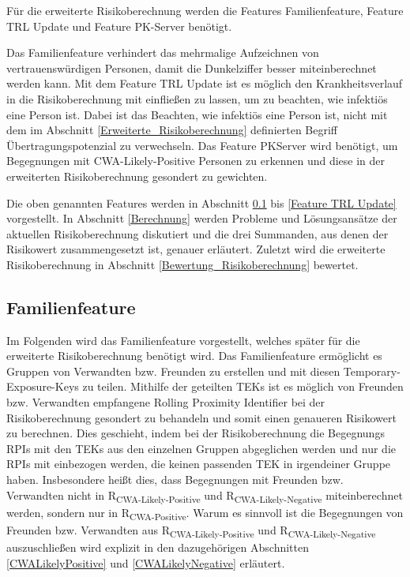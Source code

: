 \documentclass[conference,compsoc]{IEEEtran}
\begin{document}
Für die erweiterte Risikoberechnung werden die Features Familienfeature, Feature TRL Update und
Feature PK-Server benötigt.

Das Familienfeature verhindert das mehrmalige Aufzeichnen von vertrauenswürdigen Personen,
damit die Dunkelziffer besser miteinberechnet werden kann.
Mit dem Feature TRL Update ist es möglich den Krankheitsverlauf in die Risikoberechnung mit einfließen zu lassen,
um zu beachten, wie infektiös eine Person ist.
Dabei ist das Beachten, wie infektiös eine Person ist, nicht mit dem im Abschnitt \ref{Erweiterte_Risikoberechnung} definierten Begriff Übertragungspotenzial zu verwechseln.
Das Feature PKServer wird benötigt, um Begegnungen mit CWA-Likely-Positive Personen zu erkennen und diese in der erweiterten Risikoberechnung gesondert zu gewichten.

Die oben genannten Features werden in Abschnitt \ref{Familienfeature} bis \ref{Feature TRL Update} vorgestellt.
In Abschnitt \ref{Berechnung} werden Probleme und Lösungsansätze der aktuellen Risikoberechnung diskutiert und die drei Summanden, aus denen der Risikowert zusammengesetzt ist, genauer erläutert.
Zuletzt wird die erweiterte Risikoberechnung in Abschnitt \ref{Bewertung_Risikoberechnung} bewertet.
\\
\subsection{Familienfeature}
\label{Familienfeature}

Im Folgenden wird das Familienfeature vorgestellt, welches später für die erweiterte Risikoberechnung benötigt wird.
Das Familienfeature ermöglicht es Gruppen von Verwandten bzw. Freunden zu erstellen und mit diesen Temporary-Exposure-Keys zu teilen.
Mithilfe der geteilten TEKs ist es möglich von Freunden bzw. Verwandten empfangene Rolling Proximity Identifier bei der Risikoberechnung gesondert zu behandeln und somit einen genaueren Risikowert zu berechnen.
Dies geschieht, indem bei der Risikoberechnung die Begegnungs RPIs mit den TEKs aus den einzelnen Gruppen abgeglichen werden und nur die RPIs mit einbezogen werden, die keinen passenden TEK in irgendeiner Gruppe haben.
Insbesondere heißt dies, dass Begegnungen mit Freunden bzw. Verwandten nicht in R\textsubscript{CWA-Likely-Positive} und R\textsubscript{CWA-Likely-Negative} miteinberechnet werden,
sondern nur in R\textsubscript{CWA-Positive}.
Warum es sinnvoll ist die Begegnungen von Freunden bzw. Verwandten aus R\textsubscript{CWA-Likely-Positive} und R\textsubscript{CWA-Likely-Negative} auszuschließen wird explizit in den dazugehörigen Abschnitten \ref{CWALikelyPositive} und \ref{CWALikelyNegative} erläutert.
\end{document}
